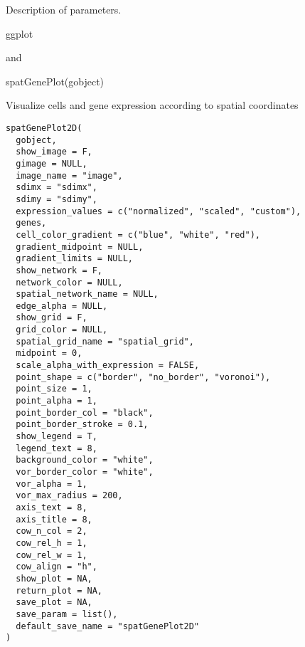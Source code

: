 \documentclass[a4paper]{book}
\begin{document}
%
\begin{Details}\relax
Description of parameters.
\end{Details}
%
\begin{Value}
ggplot
\end{Value}
%
\begin{SeeAlso}\relax
{} and 
\end{SeeAlso}
%
\begin{Examples}
\begin{ExampleCode}
    spatGenePlot(gobject)
\end{ExampleCode}
\end{Examples}
%
\begin{Description}\relax
Visualize cells and gene expression according to spatial coordinates
\end{Description}
%
\begin{Usage}
\begin{verbatim}
spatGenePlot2D(
  gobject,
  show_image = F,
  gimage = NULL,
  image_name = "image",
  sdimx = "sdimx",
  sdimy = "sdimy",
  expression_values = c("normalized", "scaled", "custom"),
  genes,
  cell_color_gradient = c("blue", "white", "red"),
  gradient_midpoint = NULL,
  gradient_limits = NULL,
  show_network = F,
  network_color = NULL,
  spatial_network_name = NULL,
  edge_alpha = NULL,
  show_grid = F,
  grid_color = NULL,
  spatial_grid_name = "spatial_grid",
  midpoint = 0,
  scale_alpha_with_expression = FALSE,
  point_shape = c("border", "no_border", "voronoi"),
  point_size = 1,
  point_alpha = 1,
  point_border_col = "black",
  point_border_stroke = 0.1,
  show_legend = T,
  legend_text = 8,
  background_color = "white",
  vor_border_color = "white",
  vor_alpha = 1,
  vor_max_radius = 200,
  axis_text = 8,
  axis_title = 8,
  cow_n_col = 2,
  cow_rel_h = 1,
  cow_rel_w = 1,
  cow_align = "h",
  show_plot = NA,
  return_plot = NA,
  save_plot = NA,
  save_param = list(),
  default_save_name = "spatGenePlot2D"
)
\end{verbatim}
\end{Usage}
%
\end{document}
